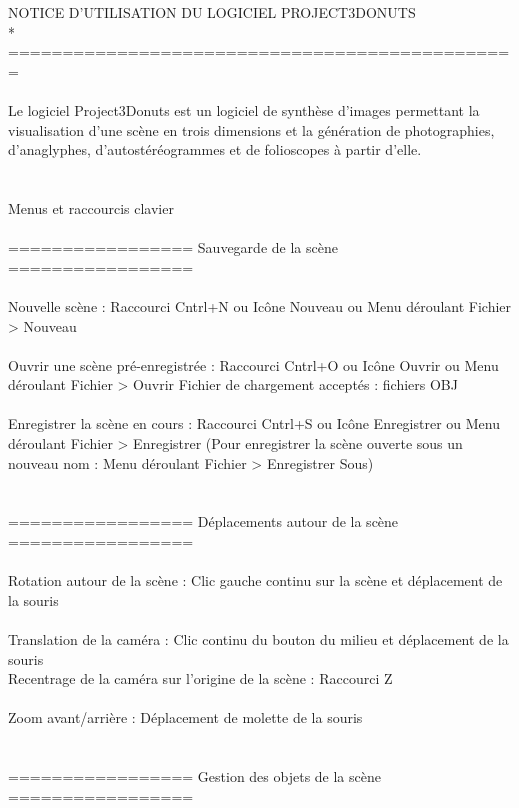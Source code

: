 NOTICE D'UTILISATION DU LOGICIEL PROJECT3DONUTS\\*
===============================================
\\ \\
Le logiciel Project3Donuts est un logiciel de synthèse d'images permettant la visualisation d'une scène en trois dimensions et la génération de photographies, d'anaglyphes, d'autostéréogrammes et de folioscopes à partir d'elle.
\\ \\ \\
Menus et raccourcis clavier
\\ \\
================= Sauvegarde de la scène =================
\\ \\
Nouvelle scène :			Raccourci Cntrl+N     
	       	 			ou     Icône Nouveau     
		 			ou     Menu déroulant Fichier > Nouveau
\\ \\
Ouvrir une scène pré-enregistrée : 	Raccourci Cntrl+O
       	   	 		   	ou      Icône Ouvrir
				   	ou	Menu déroulant Fichier > Ouvrir
		Fichier de chargement acceptés : fichiers OBJ
\\ \\
Enregistrer la scène en cours :       	Raccourci Cntrl+S
	       	     	      		ou 	Icône Enregistrer
					ou 	Menu déroulant Fichier > Enregistrer
		(Pour enregistrer la scène ouverte sous un nouveau nom : Menu déroulant Fichier > Enregistrer Sous)
\\ \\ \\
================= Déplacements autour de la scène =================
\\ \\
Rotation autour de la scène :  	        Clic gauche continu sur la scène et déplacement de la souris
\\ \\
Translation de la caméra :                    Clic continu du bouton du milieu et déplacement de la souris
\\
Recentrage de la caméra sur 
	l'origine de la scène : 			Raccourci Z
\\ \\
Zoom avant/arrière :  	    		Déplacement de molette de la souris
\\ \\ \\
================= Gestion des objets de la scène =================
